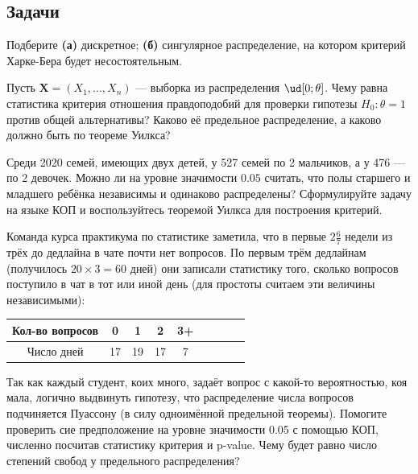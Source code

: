 \subsection*{Задачи}

\begin{problem}\label{jarque_bera_nonconsist}
    Подберите \textbf{(а)} дискретное; \textbf{(б)} сингулярное распределение, на котором критерий Харке-Бера будет несостоятельным.
\end{problem}

\begin{problem}
	Пусть $\mathbf{X} = (X_1, \ldots, X_n)$ --- выборка из распределения $\ud[0; \theta]$. Чему равна статистика критерия отношения правдоподобий для проверки гипотезы $H_0\colon \theta = 1$ против общей альтернативы? Каково её предельное распределение, а каково должно быть по теореме Уилкса?
\end{problem}

\begin{problem}
	Среди 2020 семей, имеющих двух детей, у 527 семей по 2 мальчиков, а у 476 --- по 2 девочек. Можно ли на уровне значимости $0.05$ считать, что полы старшего и младшего ребёнка независимы и одинаково распределены? Сформулируйте задачу на языке КОП и воспользуйтесь теоремой Уилкса для построения критерий.
\end{problem}

\begin{problem}
	Команда курса практикума по статистике заметила, что в первые $2\frac{6}{7}$ недели из трёх до дедлайна в чате почти нет вопросов. По первым трём дедлайнам (получилось $20 \times 3 = 60$ дней) они записали статистику того, сколько вопросов поступило в чат в тот или иной день (для простоты считаем эти величины независимыми):

\begin{center}
	\begin{tabular}{|c|c|c|c|c|c|c|c|c|}
	\hline
	Кол-во вопросов & 0 & 1 & 2 & 3+\\
	\hline
	Число дней & 17 & 19 & 17 & 7\\
	\hline
	\end{tabular}
\end{center}

Так как каждый студент, коих много, задаёт вопрос с какой-то вероятностью, коя мала, логично выдвинуть гипотезу, что распределение числа вопросов подчиняется Пуассону (в силу одноимённой предельной теоремы). Помогите проверить сие предположение на уровне значимости 0.05 с помощью КОП, численно посчитав статистику критерия и p-value. Чему будет равно число степений свобод у предельного распределения?
\end{problem}


